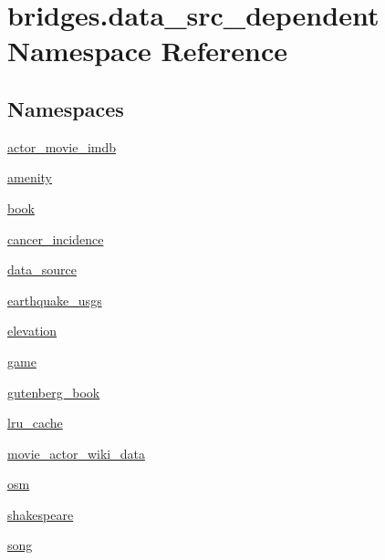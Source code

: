\hypertarget{namespacebridges_1_1data__src__dependent}{}\section{bridges.\+data\+\_\+src\+\_\+dependent Namespace Reference}
\label{namespacebridges_1_1data__src__dependent}
\subsection*{Namespaces}
\begin{DoxyCompactItemize}
\item 
 \hyperlink{namespacebridges_1_1data__src__dependent_1_1actor__movie__imdb}{actor\+\_\+movie\+\_\+imdb}
\item 
 \hyperlink{namespacebridges_1_1data__src__dependent_1_1amenity}{amenity}
\item 
 \hyperlink{namespacebridges_1_1data__src__dependent_1_1book}{book}
\item 
 \hyperlink{namespacebridges_1_1data__src__dependent_1_1cancer__incidence}{cancer\+\_\+incidence}
\item 
 \hyperlink{namespacebridges_1_1data__src__dependent_1_1data__source}{data\+\_\+source}
\item 
 \hyperlink{namespacebridges_1_1data__src__dependent_1_1earthquake__usgs}{earthquake\+\_\+usgs}
\item 
 \hyperlink{namespacebridges_1_1data__src__dependent_1_1elevation}{elevation}
\item 
 \hyperlink{namespacebridges_1_1data__src__dependent_1_1game}{game}
\item 
 \hyperlink{namespacebridges_1_1data__src__dependent_1_1gutenberg__book}{gutenberg\+\_\+book}
\item 
 \hyperlink{namespacebridges_1_1data__src__dependent_1_1lru__cache}{lru\+\_\+cache}
\item 
 \hyperlink{namespacebridges_1_1data__src__dependent_1_1movie__actor__wiki__data}{movie\+\_\+actor\+\_\+wiki\+\_\+data}
\item 
 \hyperlink{namespacebridges_1_1data__src__dependent_1_1osm}{osm}
\item 
 \hyperlink{namespacebridges_1_1data__src__dependent_1_1shakespeare}{shakespeare}
\item 
 \hyperlink{namespacebridges_1_1data__src__dependent_1_1song}{song}
\end{DoxyCompactItemize}
